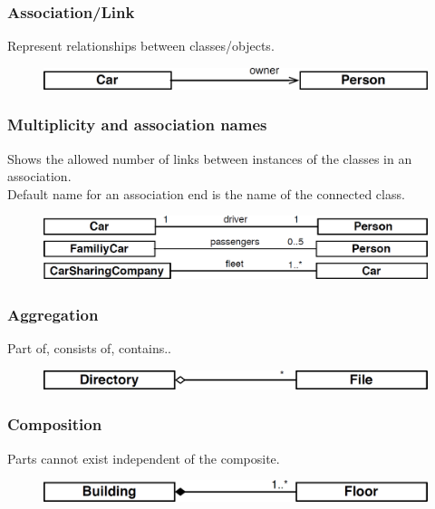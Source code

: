 \newpage
\subsubsection*{Association/Link}
Represent relationships between classes/objects.
\begin{figure}[H]
	\centering
	\includegraphics[width=0.85\linewidth]{images/oop_association}
\end{figure}
\subsubsection*{Multiplicity and association names}
Shows the allowed number of links between instances of the classes in an association.\\
Default name for an association end is the name of the connected class.
\begin{figure}[H]
	\centering
	\includegraphics[width=0.85\linewidth]{images/oop_multiplicity}
\end{figure}
\subsubsection*{Aggregation}
Part of, consists of, contains..
\begin{figure}[H]
	\centering
	\includegraphics[width=0.85\linewidth]{images/oop_aggregation}
\end{figure}
\subsubsection*{Composition}
Parts cannot exist independent of the composite.
\begin{figure}[H]
	\centering
	\includegraphics[width=0.85\linewidth]{images/oop_composition}
\end{figure}
